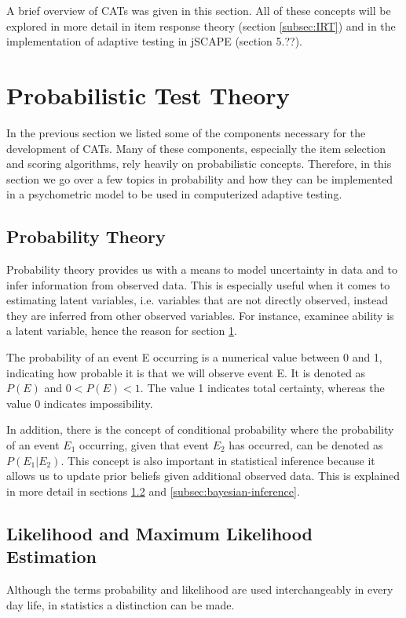 A brief overview of CATs was given in this section. All of these concepts will be explored in more detail in item response theory (section \ref{subsec:IRT}) and in the implementation of adaptive testing in jSCAPE (section 5.??).

\section{Probabilistic Test Theory}
\label{sec:probabilistic-test-theory}
In the previous section we listed some of the components necessary for the development of CATs. Many of these components, especially the item selection and scoring algorithms, rely heavily on probabilistic concepts. Therefore, in this section we go over a few topics in probability and how they can be implemented in a psychometric model to be used in computerized adaptive testing.

\subsection{Probability Theory}
\label{subsec:probability-theory}
Probability theory provides us with a means to model uncertainty in data and to infer information from observed data. This is especially useful when it comes to estimating latent variables, i.e. variables that are not directly observed, instead they are inferred from other observed variables. For instance, examinee ability is a latent variable, hence the reason for section \ref{sec:probabilistic-test-theory}.
\newline

The probability of an event E occurring is a numerical value between 0 and 1, indicating how probable it is that we will observe event E. It is denoted as $P(E)$ and $0 < P(E) < 1$. The value 1 indicates total certainty, whereas the value 0 indicates impossibility. \newline

In addition, there is the concept of conditional probability where the probability of an event $E_1$ occurring, given that event $E_2$ has occurred, can be denoted as $P(E_1|E_2)$. This concept is also important in statistical inference because it allows us to update prior beliefs given additional observed data. This is explained in more detail in sections \ref{subsec:likelihood-and-mle} and \ref{subsec:bayesian-inference}.

\subsection{Likelihood and Maximum Likelihood Estimation}
\label{subsec:likelihood-and-mle}
Although the terms probability and likelihood are used interchangeably in every day life, in statistics a distinction can be made.\newline

